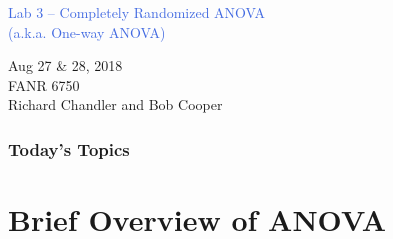 \documentclass[color=usenames,dvipsnames]{beamer}\usepackage[]{graphicx}\usepackage[]{color}
\begin{document}



\begin{frame}[plain]
  \LARGE
  \centering \par
  \textcolor{RoyalBlue}{Lab 3 -- Completely Randomized ANOVA \\
  (a.k.a. One-way ANOVA)} \par
  \vspace{1cm}
  \large
  Aug 27 \& 28, 2018 \\
  FANR 6750 \\
  \vfill
  \large
  Richard Chandler and Bob Cooper
\end{frame}








\begin{frame}[plain]
  \frametitle{Today's Topics}
  \LARGE
\end{frame}



\section{Brief Overview of ANOVA}
\end{document}

